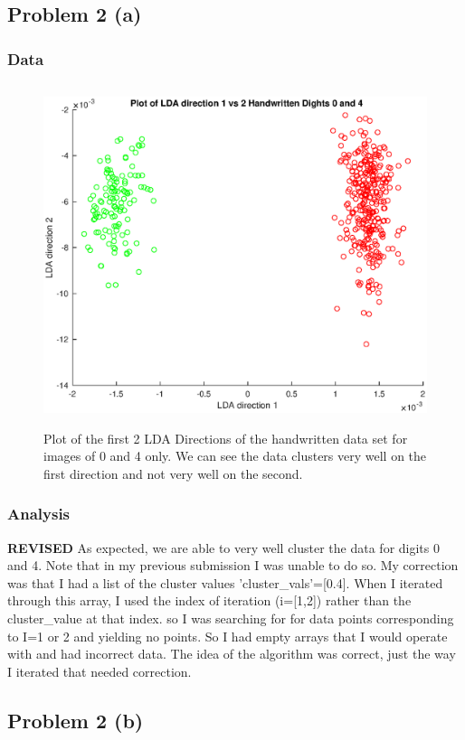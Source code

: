 \documentclass{article}
\begin{document}
\subsection*{Problem 2 (a)}
\subsubsection*{Data}
\begin{figure}[h!]
    \centerline
    {
    \includegraphics[width=15cm, height=10cm]{Q2_a_2LDA}}
    
    \caption{\label{fig:my figure} Plot of the first 2 LDA Directions of the handwritten data set for images of 0 and 4 only.  We can see the data clusters very well on the first direction and not very well on the second.}
\end{figure}
\subsubsection*{Analysis}
\textbf{REVISED} As expected, we are able to very well cluster the data for digits 0 and 4.  Note that in my previous submission I was unable to do so.  My correction was that I had a list of the cluster values 'cluster\_vals'=[0.4]. When I iterated through this array, I used the index of iteration (i=[1,2]) rather than the cluster\_value at that index. so I was searching for for data points corresponding to I=1 or 2 and yielding no points.  So I had empty arrays that I would operate with and had incorrect data.  The idea of the algorithm was correct, just the way I iterated that needed correction.  

\subsection*{Problem 2 (b)}
\end{document}
